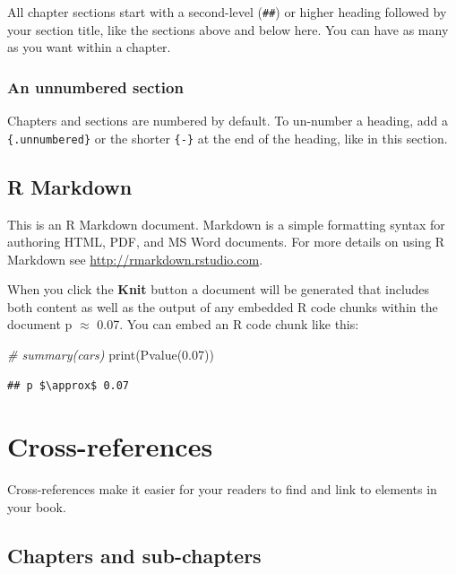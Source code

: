 \documentclass[
  12pt,
]{book}
\newenvironment{Shaded}{\begin{snugshade}}{\end{snugshade}}
\newcommand{\CommentTok}[1]{\textcolor[rgb]{0.56,0.35,0.01}{\textit{#1}}}
\newcommand{\FloatTok}[1]{\textcolor[rgb]{0.00,0.00,0.81}{#1}}
\newcommand{\FunctionTok}[1]{\textcolor[rgb]{0.00,0.00,0.00}{#1}}
\newcommand{\NormalTok}[1]{#1}
\theoremstyle{definition}
\theoremstyle{definition}
\theoremstyle{definition}
\theoremstyle{definition}
\theoremstyle{remark}
\begin{document}
All chapter sections start with a second-level (\texttt{\#\#}) or higher heading followed by your section title, like the sections above and below here. You can have as many as you want within a chapter.

\hypertarget{an-unnumbered-section}{%
\subsection*{An unnumbered section}\label{an-unnumbered-section}}

Chapters and sections are numbered by default. To un-number a heading, add a \texttt{\{.unnumbered\}} or the shorter \texttt{\{-\}} at the end of the heading, like in this section.

\hypertarget{r-markdown}{%
\section{R Markdown}\label{r-markdown}}

This is an R Markdown document. Markdown is a simple formatting syntax for authoring HTML, PDF, and MS Word documents. For more details on using R Markdown see \url{http://rmarkdown.rstudio.com}.

When you click the \textbf{Knit} button a document will be generated that includes both content as well as the output of any embedded R code chunks within the document p \(\approx\) 0.07. You can embed an R code chunk like this:

\begin{Shaded}
\begin{Highlighting}[]
\CommentTok{\# summary(cars)}
\FunctionTok{print}\NormalTok{(}\FunctionTok{Pvalue}\NormalTok{(}\FloatTok{0.07}\NormalTok{))}
\end{Highlighting}
\end{Shaded}

\begin{verbatim}
## p $\approx$ 0.07
\end{verbatim}

\hypertarget{cross}{%
\chapter{Cross-references}\label{cross}}

Cross-references make it easier for your readers to find and link to elements in your book.

\hypertarget{chapters-and-sub-chapters}{%
\section{Chapters and sub-chapters}\label{chapters-and-sub-chapters}}
\end{document}
